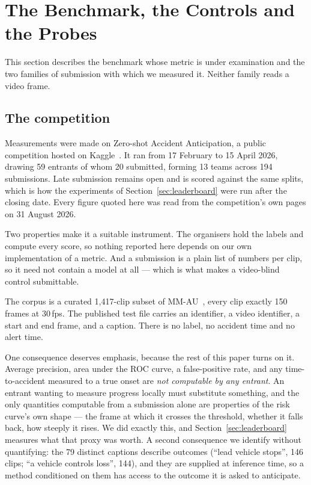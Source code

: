 \section{The Benchmark, the Controls and the Probes}
\label{sec:method}

This section describes the benchmark whose metric is under examination and the
two families of submission with which we measured it. Neither family reads a
video frame.

\subsection{The competition}
\label{sec:competition}

Measurements were made on Zero-shot Accident Anticipation, a public competition
hosted on Kaggle~\cite{autopilot2026}. It ran from 17 February to 15 April
2026, drawing 59 entrants of whom 20 submitted, forming 13 teams across 194
submissions. Late submission remains open and is scored against the same
splits, which is how the experiments of Section~\ref{sec:leaderboard} were run
after the closing date. Every figure quoted here was read from the
competition's own pages on 31 August 2026.

Two properties make it a suitable instrument. The organisers hold the labels
and compute every score, so nothing reported here depends on our own
implementation of a metric. And a submission is a plain list of numbers per
clip, so it need not contain a model at all --- which is what makes a
video-blind control submittable.

The corpus is a curated 1{,}417-clip subset of MM-AU~\cite{fang2024mmau}, every
clip exactly 150 frames at 30\,fps. The published test file carries an
identifier, a video identifier, a start and end frame, and a caption. There is
no label, no accident time and no alert time.

One consequence deserves emphasis, because the rest of this paper turns on it.
Average precision, area under the ROC curve, a false-positive rate, and any
time-to-accident measured to a true onset are \emph{not computable by any
entrant}. An entrant wanting to measure progress locally must substitute
something, and the only quantities computable from a submission alone are
properties of the risk curve's own shape --- the frame at which it crosses the
threshold, whether it falls back, how steeply it rises. We did exactly this,
and Section~\ref{sec:leaderboard} measures what that proxy was worth. A second
consequence we identify without quantifying: the 79 distinct captions describe
outcomes (``lead vehicle stops'', 146 clips; ``a vehicle controls loss'', 144),
and they are supplied at inference time, so a method conditioned on them has
access to the outcome it is asked to anticipate.

